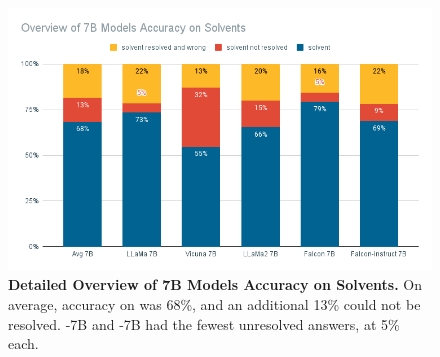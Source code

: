 \begin{figure}[!htb]
    \begin{centering}
        \includegraphics[width=\textwidth]{img/overview_7b_solv}
        \caption[7B Models Detailed Solvent Accuracy]{\textbf{Detailed Overview of 7B Models Accuracy on Solvents.}
            On average, accuracy on \tsolv was 68\%, and an additional 13\% could not be resolved.
            -7B and -7B had the fewest unresolved answers, at 5\% each.
        }
        \label{fig:7b_solv}
    \end{centering}
\end{figure}
